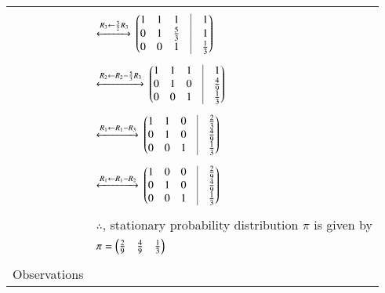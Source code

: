 \begin{longtable}{|l|l|}
		&\\
		& \qquad $\xleftrightarrow[]{R_3 \leftarrow \frac{3}{2}R_3}$
		$\myvec{1&1&1&\vrule&1\\0&1&\frac{5}{3}&\vrule&1\\0&0&1&\vrule&\frac{1}{3}}$\\
		&\\
		& \qquad $\xleftrightarrow[]{R_2 \leftarrow R_2 - \frac{5}{3}R_3}$
		$\myvec{1&1&1&\vrule&1\\0&1&0&\vrule&\frac{4}{9}\\0&0&1&\vrule&\frac{1}{3}}$\\
		&\\
		& \qquad $\xleftrightarrow[]{R_1 \leftarrow R_1 - R_3}$
		$\myvec{1&1&0&\vrule&\frac{2}{3}\\0&1&0&\vrule&\frac{4}{9}\\0&0&1&\vrule&\frac{1}{3}}$\\
		&\\
		& \qquad $\xleftrightarrow[]{R_1 \leftarrow R_1 - R_2}$
		$\myvec{1&0&0&\vrule&\frac{2}{9}\\0&1&0&\vrule&\frac{4}{9}\\0&0&1&\vrule&\frac{1}{3}}$\\
		&\\
		& $\therefore$, stationary probability distribution $\pi$ is given by \\
		& \qquad \qquad $\pi = \begin{pmatrix}\frac{2}{9} & \frac{4}{9} & \frac{1}{3}\end{pmatrix}$ \\
		& \\
		\hline
		\multirow{3}{*}{Observations} & \\
		

\end{longtable}

